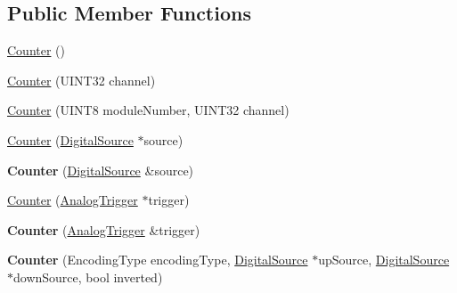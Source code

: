 \subsection*{Public Member Functions}
\begin{DoxyCompactItemize}
\item 
\hyperlink{classCounter_a1e05f69b5240fbab3e7ab351672167f0}{Counter} ()
\item 
\hyperlink{classCounter_a133b5a4e1dba8d8260000e25a9a4d124}{Counter} (UINT32 channel)
\item 
\hyperlink{classCounter_acf5e289d8c4b8db0e80f28fec89a01f2}{Counter} (UINT8 moduleNumber, UINT32 channel)
\item 
\hyperlink{classCounter_a9c7d57696e482eff75e1e03eaf6f8120}{Counter} (\hyperlink{classDigitalSource}{DigitalSource} $\ast$source)
\item 
\hypertarget{classCounter_a21f3bf6b6692bff6906c59a00b31ee54}{
{\bfseries Counter} (\hyperlink{classDigitalSource}{DigitalSource} \&source)}
\label{classCounter_a21f3bf6b6692bff6906c59a00b31ee54}

\item 
\hyperlink{classCounter_a51efc97323b6d5c42de11fa827655118}{Counter} (\hyperlink{classAnalogTrigger}{AnalogTrigger} $\ast$trigger)
\item 
\hypertarget{classCounter_a7f3b71a90529ee3dffa442f113c4ad3f}{
{\bfseries Counter} (\hyperlink{classAnalogTrigger}{AnalogTrigger} \&trigger)}
\label{classCounter_a7f3b71a90529ee3dffa442f113c4ad3f}

\item 
\hypertarget{classCounter_a37eface38998556665b5f88e35db7d16}{
{\bfseries Counter} (EncodingType encodingType, \hyperlink{classDigitalSource}{DigitalSource} $\ast$upSource, \hyperlink{classDigitalSource}{DigitalSource} $\ast$downSource, bool inverted)}
\label{classCounter_a37eface38998556665b5f88e35db7d16}


\end{DoxyCompactItemize}
